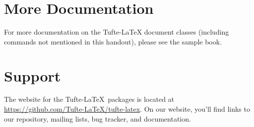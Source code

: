 \documentclass[a4paper]{tufte-handout}
\begin{document}
\section{More Documentation}\label{sec:more-doc}
For more documentation on the Tufte-\LaTeX{} document classes (including commands not
mentioned in this handout), please see the sample book.

\section{Support}\label{sec:support}

The website for the Tufte-\LaTeX\ packages is located at
\url{https://github.com/Tufte-LaTeX/tufte-latex}. On our website, you'll find
links to our  repository, mailing lists, bug tracker, and documentation.

\printbibliography[heading=bibnumbered]
\end{document}
